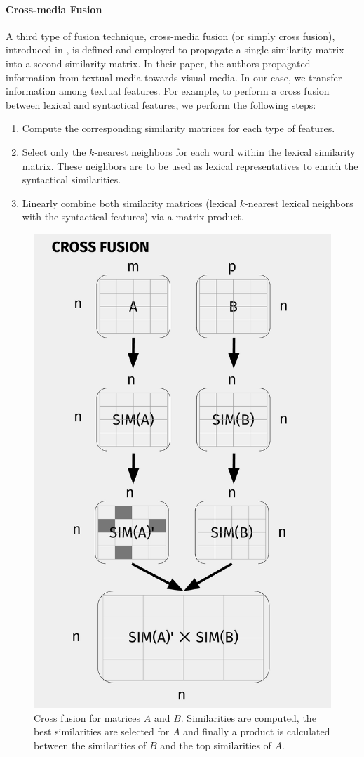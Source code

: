 \paragraph{Cross-media  Fusion}
%
A third type of fusion technique, cross-media  fusion (or simply cross fusion),   introduced in \cite{Ah-PineCC15,ClinchantAC11}, is defined and employed to propagate a single similarity matrix into a second similarity matrix. In their paper, the authors propagated information from textual media towards visual media. In our case, we transfer information among textual features. For example, to perform a cross fusion between lexical and syntactical features, we perform the following steps: 
\begin{enumerate}
\item Compute the corresponding similarity matrices for each type of features.
\item Select only the $k$-nearest neighbors for each word within the lexical similarity matrix. These neighbors are to be used as lexical representatives to enrich the syntactical similarities.
\item Linearly combine both similarity matrices (lexical $k$-nearest lexical neighbors with the syntactical features) via a matrix product.
\end{enumerate}  

\begin{figure}
\centering
\includegraphics[width=0.6\linewidth]{images/Chapitre3/xf_diag.pdf}
\caption{Cross fusion for matrices $A$ and $B$. Similarities are computed, the best similarities are selected for $A$ and finally a product is calculated between the similarities of $B$ and the top similarities of $A$.}
\label{fig:xf_diag}
\end{figure}

